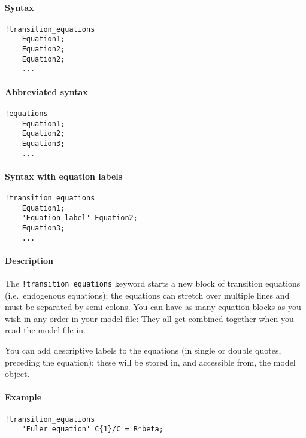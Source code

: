 


	\paragraph{Syntax}

\begin{verbatim}
!transition_equations
    Equation1;
    Equation2;
    Equation2;
    ...
\end{verbatim}

\paragraph{Abbreviated syntax}

\begin{verbatim}
!equations
    Equation1;
    Equation2;
    Equation3;
    ...
\end{verbatim}

\paragraph{Syntax with equation
labels}

\begin{verbatim}
!transition_equations
    Equation1;
    'Equation label' Equation2;
    Equation3;
    ...
\end{verbatim}

\paragraph{Description}

The \texttt{!transition\_equations} keyword starts a new block of
transition equations (i.e.~endogenous equations); the equations can
stretch over multiple lines and must be separated by semi-colons. You
can have as many equation blocks as you wish in any order in your model
file: They all get combined together when you read the model file in.

You can add descriptive labels to the equations (in single or double
quotes, preceding the equation); these will be stored in, and accessible
from, the model object.

\paragraph{Example}

\begin{verbatim}
!transition_equations
    'Euler equation' C{1}/C = R*beta;
\end{verbatim}


